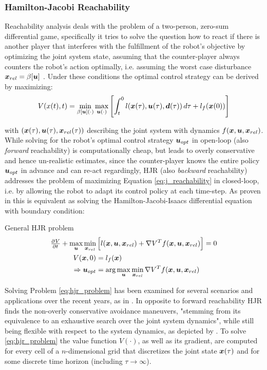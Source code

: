 \subsubsection{Hamilton-Jacobi Reachability} 
Reachability analysis deals with the problem of a two-person, zero-sum differential game, specifically it tries to solve the question how to react if there is another player that interferes with the fulfillment of the robot's objective by optimizing the joint system state, assuming that the counter-player always counters the robot's action optimally, i.e. assuming the worst case disturbance $\boldsymbol{x}_{rel} = \beta[\boldsymbol{u}]$ \cite{Pavone2020}. Under these conditions the optimal control strategy can be derived by maximizing: \\

\begin{equation}
V(x(t), t) = \min_{\beta[\boldsymbol{u}](\cdot)} \max_{\boldsymbol{u}(\cdot)} \left[ \int_t^0 l(\boldsymbol{x}(\tau), \boldsymbol{u}(\tau), \boldsymbol{d}(\tau)) \, d\tau + l_f(\boldsymbol{x}(0)) \right]
\label{eq:j_reachability}
\end{equation}

with $(\boldsymbol{x}(\tau), \boldsymbol{u}(\tau), \boldsymbol{x}_{rel}(\tau))$ describing the joint system with dynamics $f(\boldsymbol{x}, \boldsymbol{u}, \boldsymbol{x}_{rel})$. While solving for the robot's optimal control strategy $\boldsymbol{u}_{opt}$ in open-loop (also \textit{forward} reachability) is computationally cheap, but leads to overly conservative and hence un-realistic estimates, since the counter-player knows the entire policy $\boldsymbol{u}_{opt}$ in advance and can re-act regardingly, \ac{HJR} (also \textit{backward} reachability) addresses the problem of maximizing Equation \ref{eq:j_reachability} in closed-loop, i.e. by allowing the robot to adapt its control policy at each time-step. As proven in \cite{Pavone2020} this is equivalent as solving the Hamilton-Jacobi-Isaacs differential equation with boundary condition: \\

\begin{problem}{General \ac{HJR} problem}
\begin{align}
\pd{V}{t} + \max_{\u}  \min_{\d} &\left[l(\x, \u, \d) + \nabla V^T f(\x, \u, \d) \right] = 0 \\ 
V(\x, 0) &= l_f(\x) \\
\Rightarrow \u_{opt} &= \arg \max_{\u}  \min_{\d} \nabla V^T f(\x, \u, \d)
\label{eq:hjr_problem_u}
\end{align}
\label{eq:hjr_problem}
\end{problem}

Solving Problem \ref{eq:hjr_problem} has been examined for several scenarios and applications over the recent years, as in \cite{Dhinakaran2017}\cite{Margellos2009}\cite{Chen2017b}. In opposite to forward reachability \ac{HJR} finds the non-overly conservative avoidance maneuvers, "stemming from its equivalence to an exhaustive search over the joint system dynamics", while still being flexible with respect to the system dynamics, as depicted by \cite{Leung2020}. To solve \ref{eq:hjr_problem} the value function $V(\cdot)$, as well as its gradient, are computed for every cell of a $n$-dimensional grid that discretizes the joint state $\boldsymbol{x}(\tau)$ and for some discrete time horizon (including $\tau \rightarrow \infty$). 

